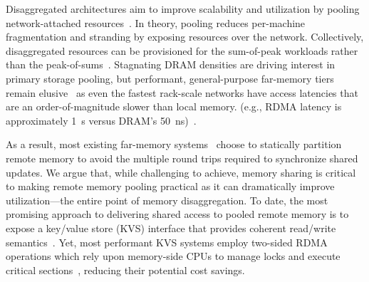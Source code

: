 Disaggregated architectures aim to improve scalability and utilization
by pooling network-attached
resources~\cite{dredbox,firebox,blade-server,legoos}.  In theory,
pooling reduces per-machine fragmentation and stranding by exposing
resources over the network. Collectively, disaggregated resources can
be provisioned for the sum-of-peak workloads rather than the
peak-of-sums~\cite{dsnf,supernic}. Stagnating DRAM
densities are driving interest in primary storage pooling, but
performant, general-purpose far-memory tiers remain
elusive~\cite{fastswap,3po,kona,infiniswap,hydra,leap,legoos,dilos} as
even the fastest rack-scale networks have access
latencies that are an order-of-magnitude slower than local memory.
(e.g., RDMA latency is approximately 1~{\textmu}s versus DRAM's
50~ns)~\cite{clover}.



As a result, most existing far-memory systems~\cite{kona,mira,aifm,trackfm,carbink} choose to statically partition remote memory to avoid the multiple round trips required to 
synchronize shared updates.
We argue that, while challenging to achieve, memory sharing is
critical to making remote memory pooling practical as it can
dramatically improve utilization---the entire point of memory
disaggregation.  To date, the most promising approach to delivering
shared access to pooled remote memory is to expose a key/value store
(KVS) interface that provides coherent read/write
semantics~\cite{rolex,smart,ditto,fusee,clover,sherman,ford}.  Yet,
most performant KVS systems employ two-sided RDMA operations which rely upon
memory-side CPUs to manage locks and execute critical
sections~\cite{memc3,cuckoo-improvements,pilaf,cell}, reducing their
potential cost savings.

